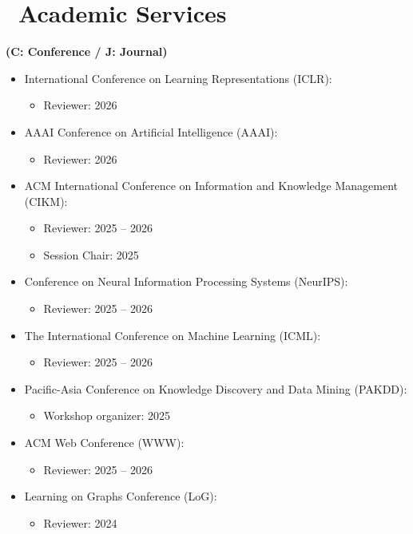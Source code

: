 \documentclass{resume}
\begin{document}
\section{\faPencil\ Academic Services}
\textbf{(C: Conference / J: Journal)}
\begin{itemize}[parsep=0.5ex]
\item [{[C11]}] International Conference on Learning Representations (ICLR):
\begin{itemize}
    \item Reviewer: 2026
\end{itemize}
\item [{[C10]}] AAAI Conference on Artificial Intelligence (AAAI): 
\begin{itemize}
    \item Reviewer: 2026
\end{itemize}
\item [{[C9]}] ACM International Conference on Information and Knowledge Management (CIKM): 
\begin{itemize}
    \item Reviewer: 2025 -- 2026
    \item Session Chair: 2025
\end{itemize}
\item [{[C8]}] Conference on Neural Information Processing Systems (NeurIPS): 
\begin{itemize}
    \item Reviewer: 2025 -- 2026
\end{itemize}
\item [{[C7]}] The International Conference on Machine Learning (ICML): 
\begin{itemize}
    \item Reviewer: 2025 -- 2026
\end{itemize}
\item [{[C6]}] Pacific-Asia Conference on Knowledge Discovery and Data Mining (PAKDD): 
\begin{itemize}
    \item Workshop organizer: 2025
\end{itemize}
\item [{[C5]}] ACM Web Conference (WWW): 
\begin{itemize}
    \item Reviewer: 2025 -- 2026
\end{itemize}
\item [{[C4]}] Learning on Graphs Conference (LoG): 
\begin{itemize}
    \item Reviewer: 2024

\end{itemize}
\end{itemize}
\end{document}

